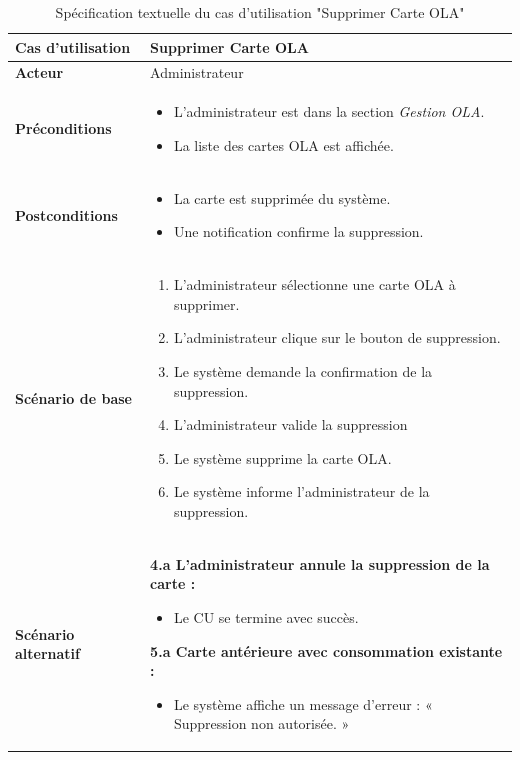 \documentclass[a4paper,11pt]{report}
\begin{document}
\begin{table}[H]
  \centering
  \renewcommand{\arraystretch}{1.5}
  \caption{Spécification textuelle du cas d'utilisation "Supprimer Carte OLA"}
  \begin{tabularx}{\textwidth}{|l|X|}
    \hline
    \textbf{Cas d'utilisation} & Supprimer Carte OLA \\ \hline
    \textbf{Acteur} & Administrateur \\ \hline
    \textbf{Préconditions} & 
    \begin{itemize}
      \item L'administrateur est dans la section \textit{Gestion OLA}.
      \item La liste des cartes OLA est affichée.
    \end{itemize} \\ \hline
    \textbf{Postconditions} & 
    \begin{itemize}
      \item La carte est supprimée du système.
      \item Une notification confirme la suppression.
    \end{itemize} \\ \hline
    \textbf{Scénario de base} & 
    \begin{enumerate}
      \item L’administrateur sélectionne une carte OLA à supprimer.
      \item L’administrateur clique sur le bouton de suppression.
      \item Le système demande la confirmation de la suppression.
      \item L’administrateur valide la suppression
      \item Le système supprime la carte OLA.
      \item Le système informe l’administrateur de la suppression.
    \end{enumerate} \\ \hline
    \textbf{Scénario alternatif} & 
    \textbf{4.a L'administrateur annule la suppression de la carte :}
    \begin{itemize}
      \item Le CU se termine avec succès.
    \end{itemize}
    \textbf{5.a Carte antérieure avec consommation existante :}
    \begin{itemize}
      \item Le système affiche un message d’erreur : « Suppression non autorisée. »
    \end{itemize} \\ \hline
    
  \end{tabularx}
\end{table}
\end{document}
